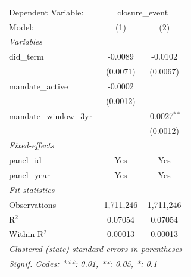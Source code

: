 
\begingroup
\centering
\begin{tabular}{lcc}
   \tabularnewline \midrule \midrule
   Dependent Variable: & \multicolumn{2}{c}{closure\_event}\\
   Model:                 & (1)       & (2)\\  
   \midrule
   \emph{Variables}\\
   did\_term              & -0.0089   & -0.0102\\   
                          & (0.0071)  & (0.0067)\\   
   mandate\_active        & -0.0002   &   \\   
                          & (0.0012)  &   \\   
   mandate\_window\_3yr   &           & -0.0027$^{**}$\\   
                          &           & (0.0012)\\   
   \midrule
   \emph{Fixed-effects}\\
   panel\_id              & Yes       & Yes\\  
   panel\_year            & Yes       & Yes\\  
   \midrule
   \emph{Fit statistics}\\
   Observations           & 1,711,246 & 1,711,246\\  
   R$^2$                  & 0.07054   & 0.07054\\  
   Within R$^2$           & 0.00013   & 0.00013\\  
   \midrule \midrule
   \multicolumn{3}{l}{\emph{Clustered (state) standard-errors in parentheses}}\\
   \multicolumn{3}{l}{\emph{Signif. Codes: ***: 0.01, **: 0.05, *: 0.1}}\\
\end{tabular}
\par\endgroup


